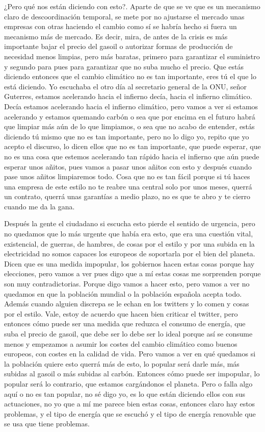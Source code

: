 ¿Pero qué nos están diciendo con esto?. Aparte de que se ve que es un mecanismo claro de descoordinación temporal, se mete por no ajustarse el mercado unas empresas con otras haciendo el cambio como sí se habría hecho si fuera un mecanismo más de mercado. Es decir, mira, de antes de la crisis es más importante bajar el precio del gasoil o autorizar formas de producción de necesidad menos limpias, pero más baratas, primero para garantizar el suministro y segundo para pues para garantizar que no suba mucho el precio. Que estás diciendo entonces que el cambio climático no es tan importante, eres tú el que lo está diciendo. Yo escuchaba el otro día al secretario general de la ONU, señor Guterres, estamos acelerando hacia el infierno decía, hacia el infierno climático. Decía estamos acelerando hacia el infierno climático, pero vamos a ver si estamos acelerando y estamos quemando carbón o sea que por encima en el futuro habrá que limpiar más aún de lo que limpiamos, o sea que no acabo de entender, estás diciendo tú mismo que no es tan importante, pero no lo digo yo, repito que yo acepto el discurso, lo dicen ellos que no es tan importante, que puede esperar, que no es una cosa que estemos acelerando tan rápido hacia el infierno que aún puede esperar unos añitos, pues vamos a pasar unos añitos con esto y después cuando pase unos añitos limpiaremos todo. Cosa que no es tan fácil porque si tú haces una empresa de este estilo no te reabre una central solo por unos meses, querrá un contrato, querrá unas garantías a medio plazo, no es que te abro y te cierro cuando me da la gana.

Después la gente el ciudadano si escucha esto pierde el sentido de urgencia, pero no quedamos que lo más urgente que había era esto, que era una cuestión vital, existencial, de guerras, de hambres, de cosas por el estilo y por una subida en la electricidad no somos capaces los europeos de soportarla por el bien del planeta. Dicen que es una medida impopular, los gobiernos hacen estas cosas porque hay elecciones, pero vamos a ver pues digo que a mí estas cosas me sorprenden porque son muy contradictorias. Porque digo vamos a hacer esto, pero vamos a ver no quedamos en que la población mundial o la población española acepta todo. Además cuando alguien discrepa se le echan en los twitters y lo comen y cosas por el estilo. Vale, estoy de acuerdo que hacen bien criticar el twitter, pero entonces cómo puede ser una medida que reduzca el consumo de energía, que suba el precio de gasoil, que debe ser lo debe ser lo ideal porque así se consume menos y empezamos a asumir los costes del cambio climático como buenos europeos, con costes en la calidad de vida. Pero vamos a ver en qué quedamos si la población quiere esto querrá más de esto, lo popular será darle más, más subidas al gasoil o más subidas al carbón. Entonces cómo puede ser impopular, lo popular será lo contrario, que estamos cargándonos el planeta. Pero o falla algo aquí o no es tan popular, no sé digo yo, es lo que están diciendo ellos con sus actuaciones, no yo que a mí me parece bien estas cosas, entonces claro hay estos problemas, y el tipo de energía que se escuchó y el tipo de energía renovable que se usa que tiene problemas.

